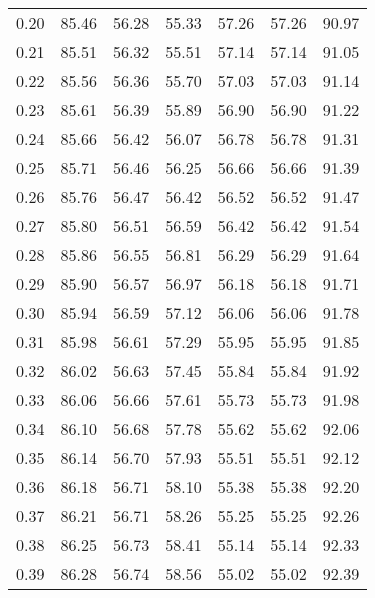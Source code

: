 \begin{tabular}{|c|c|c|c|c|c|c|}
      0.20 &     85.46 &     56.28 &      55.33 &   57.26 &      57.26 &         90.97 \\
      0.21 &     85.51 &     56.32 &      55.51 &   57.14 &      57.14 &         91.05 \\
      0.22 &     85.56 &     56.36 &      55.70 &   57.03 &      57.03 &         91.14 \\
      0.23 &     85.61 &     56.39 &      55.89 &   56.90 &      56.90 &         91.22 \\
      0.24 &     85.66 &     56.42 &      56.07 &   56.78 &      56.78 &         91.31 \\
      0.25 &     85.71 &     56.46 &      56.25 &   56.66 &      56.66 &         91.39 \\
      0.26 &     85.76 &     56.47 &      56.42 &   56.52 &      56.52 &         91.47 \\
      0.27 &     85.80 &     56.51 &      56.59 &   56.42 &      56.42 &         91.54 \\
      0.28 &     85.86 &     56.55 &      56.81 &   56.29 &      56.29 &         91.64 \\
      0.29 &     85.90 &     56.57 &      56.97 &   56.18 &      56.18 &         91.71 \\
      0.30 &     85.94 &     56.59 &      57.12 &   56.06 &      56.06 &         91.78 \\
      0.31 &     85.98 &     56.61 &      57.29 &   55.95 &      55.95 &         91.85 \\
      0.32 &     86.02 &     56.63 &      57.45 &   55.84 &      55.84 &         91.92 \\
      0.33 &     86.06 &     56.66 &      57.61 &   55.73 &      55.73 &         91.98 \\
      0.34 &     86.10 &     56.68 &      57.78 &   55.62 &      55.62 &         92.06 \\
      0.35 &     86.14 &     56.70 &      57.93 &   55.51 &      55.51 &         92.12 \\
      0.36 &     86.18 &     56.71 &      58.10 &   55.38 &      55.38 &         92.20 \\
      0.37 &     86.21 &     56.71 &      58.26 &   55.25 &      55.25 &         92.26 \\
      0.38 &     86.25 &     56.73 &      58.41 &   55.14 &      55.14 &         92.33 \\
      0.39 &     86.28 &     56.74 &      58.56 &   55.02 &      55.02 &         92.39 \\

\end{tabular}
